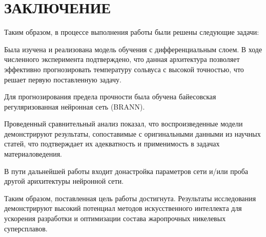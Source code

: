 \chapter*{\centering ЗАКЛЮЧЕНИЕ}


Таким образом, в процессе выполнения работы были решены следующие
задачи:
\begin{itemizePaper}
    \item Была изучена и реализована модель обучения с 
    дифференциальным слоем. В ходе численного эксперимента 
    подтверждено, что данная архитектура позволяет эффективно 
    прогнозировать температуру сольвуса с высокой точностью, 
    что решает первую поставленную задачу.
    
    \item Для прогнозирования предела прочности была обучена 
    байесовская регуляризованная нейронная сеть (BRANN).
    
    \item Проведенный сравнительный анализ показал, что 
    воспроизведенные модели демонстрируют результаты, 
    сопоставимые с оригинальными данными из научных статей, 
    что подтверждает их адекватность и применимость в задачах 
    материаловедения.

\end{itemizePaper}

В пути дальнейшей работы входит донастройка параметров сети 
и/или проба другой арихитектуры нейронной сети.

Таким образом, поставленная цель работы достигнута. Результаты
исследования демонстрируют высокий потенциал методов искусственного 
интеллекта для ускорения разработки и оптимизации состава 
жаропрочных никелевых суперсплавов.

